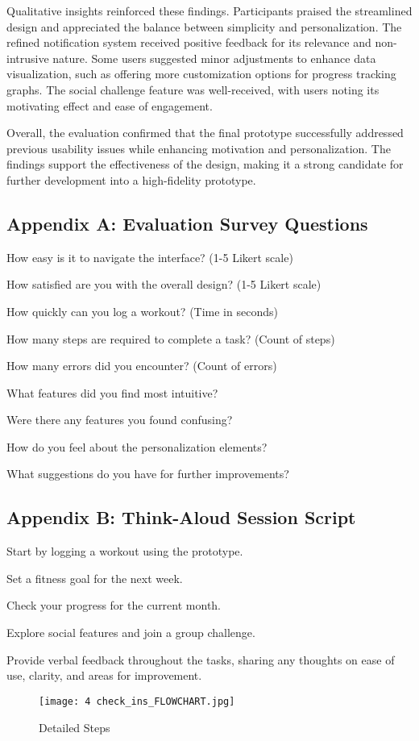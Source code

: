 \documentclass[
	letterpaper, %
]{jdf}
\begin{document}
Qualitative insights reinforced these findings. Participants praised the streamlined design and appreciated the balance between simplicity and personalization. The refined notification system received positive feedback for its relevance and non-intrusive nature. Some users suggested minor adjustments to enhance data visualization, such as offering more customization options for progress tracking graphs. The social challenge feature was well-received, with users noting its motivating effect and ease of engagement.

Overall, the evaluation confirmed that the final prototype successfully addressed previous usability issues while enhancing motivation and personalization. The findings support the effectiveness of the design, making it a strong candidate for further development into a high-fidelity prototype.

\subsection{Appendix A: Evaluation Survey Questions}
How easy is it to navigate the interface? (1-5 Likert scale)

How satisfied are you with the overall design? (1-5 Likert scale)

How quickly can you log a workout? (Time in seconds)

How many steps are required to complete a task? (Count of steps)

How many errors did you encounter? (Count of errors)

What features did you find most intuitive?

Were there any features you found confusing?

How do you feel about the personalization elements?

What suggestions do you have for further improvements?

\subsection{Appendix B: Think-Aloud Session Script}
Start by logging a workout using the prototype.

Set a fitness goal for the next week.

Check your progress for the current month.

Explore social features and join a group challenge.

Provide verbal feedback throughout the tasks, sharing any thoughts on ease of use, clarity, and areas for improvement.

\begin{figure}
    \centering
    \texttt{[image: 4 check\_ins\_FLOWCHART.jpg]}
    \caption{Detailed Steps}
    \label{fig:enter-label}
\end{figure}
\end{document}
